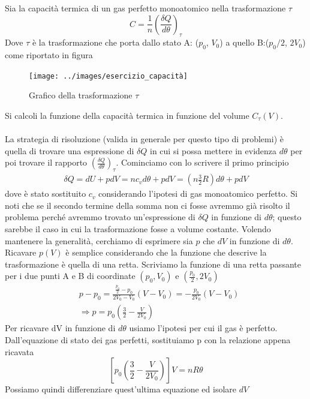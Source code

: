 \documentclass[
10pt, %
a4paper, %
oneside, %
headinclude,footinclude, %
BCOR5mm, %
]{scrartcl}
\begin{document}
\begin{exercise}
	Sia la capacità termica di un gas perfetto monoatomico nella trasformazione $\tau$ \[C = \frac{1}{n}\left(\frac{\delta Q}{d\theta}\right)_{\tau}\] 
	Dove $\tau$ è la trasformazione che porta dallo stato A: ($p_0$, $V_0$) a quello B:($p_0/2$, $2V_0$) come riportato in figura
	\begin{figure}[h!]
		\centering
		\texttt{[image: ../images/esercizio\_capacità]}
		\caption{Grafico della trasformazione $\tau$}
		\label{fig:eserciziocapacita}
	\end{figure}
	\FloatBarrier
	Si calcoli la funzione della capacità termica in funzione del volume \(C_{\tau}(V)\).\\\\
	
	La strategia di risoluzione (valida in generale per questo tipo di problemi) è quella di trovare una espressione di $\delta Q$ in cui si possa mettere in evidenza \(d\theta\) per poi trovare il rapporto \(\left(\frac{\delta Q}{d\theta}\right)_{\tau}\). Cominciamo con lo scrivere il primo principio 
	\begin{align*}
		\delta Q = dU + pdV = n c_v d\theta + pdV = \left(n \frac{3}{2} R\right) d\theta + pdV
	\end{align*} 
	dove è stato sostituito $c_v$ considerando l'ipotesi di gas monoatomico perfetto. Si noti che se il secondo termine della somma non ci fosse avremmo già risolto il problema perché avremmo trovato un'espressione di $\delta Q$ in funzione di $d\theta$; questo sarebbe il caso in cui la trasformazione fosse a volume costante. Volendo mantenere la generalità, cerchiamo di esprimere sia $p$ che $dV$ in funzione di $d\theta$. Ricavare \(p(V)\) è semplice considerando che la funzione che descrive la trasformazione è quella di una retta. Scriviamo la funzione di una retta passante per i due punti A e B di coordinate \((p_0, V_0)\) e \((\frac{p_0}{2}, 2 V_0)\)
	\begin{align*}
		&p-p_0 = \frac{\frac{p_0}{2}-p_0}{2V_0 - V_0}(V-V_0) = -\frac{p_0}{2V_0}(V-V_0) \\
		&\Rightarrow p = p_0 \left(\frac{3}{2} - \frac{V}{2 V_0}\right)
	\end{align*}  
	Per ricavare dV in funzione di $d\theta$ usiamo l'ipotesi per cui il gas è perfetto. Dall'equazione di stato dei gas perfetti, sostituiamo p con la relazione appena ricavata
	\[\left[p_0\left(\frac{3}{2} - \frac{V}{2 V_0} \right) \right] V = n R \theta \] 
	Possiamo quindi differenziare quest'ultima equazione ed isolare $dV$

\end{exercise}
\end{document}
